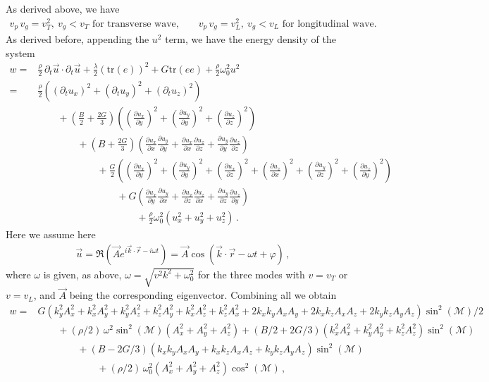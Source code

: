 \documentclass[11pt, onesided]{book}
\theoremstyle{break}
\theoremstyle{break}
\newcommand{\pd}{\partial}
\begin{document}
As derived above, we have 
\begin{align*}
v_p \, v_g = v_T^2,\ v_g<v_T \text{ for transverse wave,}\qquad
v_p \, v_g = v_L^2,\ v_g<v_L \text{ for longitudinal wave.}
\end{align*}
As derived before, appending the $u^2$ term, we have the energy density of the system
\begin{align*}
w 
=& \frac{\rho}{2}\,\pd_t \vec{u}\cdot \pd_t \vec{u} + \frac{\lambda}{2}(\text{tr}(e))^2 + G\text{tr}(ee) + \frac{\rho}{2}\omega_0^2 u^2\\
=& \frac{\rho}{2}\left( (\pd_t u_x)^2 + (\pd_t u_y)^2 + (\pd_t u_z)^2\right)\\
&{}\qquad + \left( \frac{B}{2} + \frac{2G}{3}\right) \left( \left( \frac{\pd u_x}{\pd y}\right)^2 + \left( \frac{\pd u_y}{\pd y}\right)^2 + \left( \frac{\pd u_z}{\pd z}\right)^2 \right) \\
&{}\qquad\qquad + \left( B + \frac{2G}{3}\right)\left( \frac{\pd u_x}{\pd x} \frac{\pd u_y}{\pd y} + \frac{\pd u_x}{\pd x}\frac{\pd u_z}{\pd z} + \frac{\pd u_y}{\pd y}\frac{\pd u_z}{\pd z}\right)\\
&{}\qquad\qquad\qquad + \frac{G}{2}\left(
\left( \frac{\pd u_x}{\pd y}\right)^2+
\left( \frac{\pd u_y}{\pd y}\right)^2+
\left( \frac{\pd u_x}{\pd z}\right)^2+
\left( \frac{\pd u_z}{\pd x}\right)^2+
\left( \frac{\pd u_y}{\pd z}\right)^2+
\left( \frac{\pd u_z}{\pd y}\right)^2\right)\\
&{}\qquad\qquad\qquad\qquad + G\left( \frac{\pd u_x }{\pd y} \frac{\pd u_y}{\pd x} + \frac{\pd u_x}{\pd z} \frac{\pd u_z}{\pd x} + \frac{\pd u_y}{\pd z} \frac{\pd u_z}{\pd y}\right) \\
&{}\qquad\qquad\qquad\qquad\qquad +\frac{\rho}{2}\omega_0^2 \left( u_x^2 + u_y^2 + u_z^2\right)\,.
\end{align*}
Here we assume here
\begin{align*}
\vec{u} = \Re\left( \vec{A}e^{i\vec{k}\cdot \vec{r} -i\omega t}\right) = \vec{A}\cos(\vec{k}\cdot \vec{r} - \omega t + \varphi)\,,
\end{align*}
where $\omega$ is given, as above, $\omega = \sqrt{v^2k^2 + \omega_0^2}$ for the three modes with $v= v_T$ or $v= v_L$, and $\vec{A}$ being the corresponding eigenvector. Combining all we obtain
\begin{align*}
w =& 
G\left( k_y^2A_x^2 + k_x^2 A_y^2 + k_y^2A_z^2 + k_z^2A_y^2 + k_x^2 A_z^2 + k_z^2A_x^2 + 2k_xk_yA_xA_y + 2k_xk_zA_xA_z + 2k_yk_zA_yA_z\right)\sin^2(\mathcal{M})/2\\
&\qquad + 
(\rho/2)\,\omega^2 \sin^2(\mathcal{M}) (A_x^2 + A_y^2 + A_z^2) +\left( B/2 +2G/3\right) \left( k_x^2A_x^2 + k_y^2A_y^2 +k_z^2A_z^2\right) \sin^2(\mathcal{M})\\
&\qquad\qquad + \left( B - 2G/3\right) \left( k_xk_yA_xA_y + k_xk_zA_xA_z + k_yk_zA_yA_z\right) \sin^2(\mathcal{M})\\
&\qquad\qquad\qquad + (\rho/2)\,\omega_0^2\left( A_x^2 + A_y^2 + A_z^2 \right)\cos^2(\mathcal{M})\,,
\end{align*}
\end{document}
